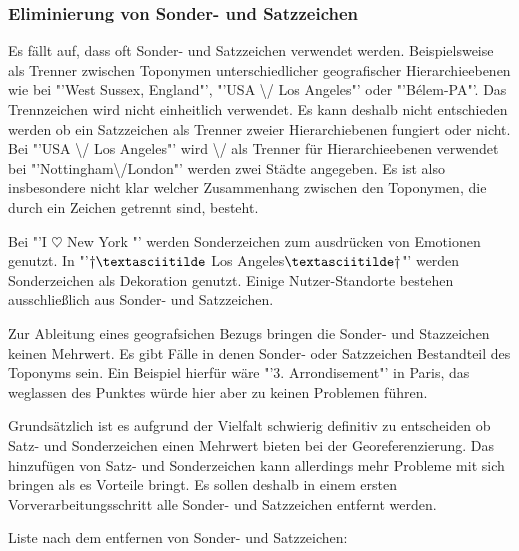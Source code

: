 			\subsubsection{Eliminierung von Sonder- und Satzzeichen} 

				Es fällt auf, dass oft Sonder- und Satzzeichen verwendet werden. 
				Beispielsweise als Trenner zwischen Toponymen unterschiedlicher geografischer Hierarchieebenen wie bei "'West Sussex, England"', "'USA \textbackslash/ Los Angeles"' oder "'Bélem-PA"'.
				Das Trennzeichen wird nicht einheitlich verwendet.  
				Es kann deshalb nicht entschieden werden ob ein Satzzeichen als Trenner zweier Hierarchiebenen fungiert oder nicht.
				Bei "'USA \textbackslash/ Los Angeles"' wird \textbackslash/ als Trenner für Hierarchieebenen verwendet bei "'Nottingham\textbackslash/London"' werden zwei Städte angegeben.
				Es ist also insbesondere nicht klar welcher Zusammenhang zwischen den Toponymen, die durch ein Zeichen getrennt sind, besteht. 

				Bei "'I $\heartsuit$ New York "' werden Sonderzeichen zum ausdrücken von Emotionen genutzt.
				In "'$\dagger\textasciitilde$ Los Angeles$\textasciitilde\dagger$"' werden Sonderzeichen als Dekoration genutzt.
				Einige Nutzer-Standorte bestehen ausschließlich aus Sonder- und Satzzeichen.

				Zur Ableitung eines geografsichen Bezugs bringen die Sonder- und Stazzeichen keinen Mehrwert.
				Es gibt Fälle in denen Sonder- oder Satzzeichen Bestandteil des Toponyms sein.
				Ein Beispiel hierfür wäre "'3. Arrondisement"' in Paris, das weglassen des Punktes würde hier aber zu keinen Problemen führen.
				
				Grundsätzlich ist es aufgrund der Vielfalt schwierig definitiv zu entscheiden ob Satz- und Sonderzeichen einen Mehrwert bieten bei der Georeferenzierung. 
				Das hinzufügen von Satz- und Sonderzeichen kann allerdings mehr Probleme mit sich bringen als es Vorteile bringt.
				Es sollen deshalb in einem ersten Vorverarbeitungsschritt alle Sonder- und Satzzeichen entfernt werden. 

				Liste nach dem entfernen von Sonder- und Satzzeichen:

